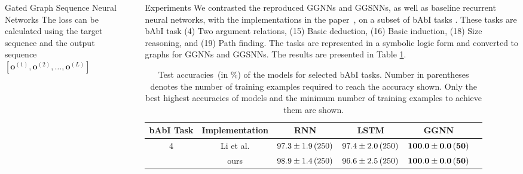 \documentclass[final,hyperref={pdfpagelabels=false}]{beamer}
\newcommand{\shrink}{-15pt}
\begin{document}
\begin{frame}[t]
\begin{columns}[t]
\begin{column}{.3\textwidth}
\begin{block}{Gated Graph Sequence Neural Networks}
    The loss can be calculated using the target sequence and the output sequence $[\boldsymbol{o}^{(1)}, \boldsymbol{o}^{(2)}, \ldots, \boldsymbol{o}^{(L)}]$
    
    \end{block}
    
    
    

  \end{column} %


  \begin{column}{.02\textwidth}\end{column} %
    
  \begin{column}{.3\textwidth} %
  
  \vspace{\shrink}
    \begin{block}{Experiments}
      We contrasted the reproduced GGNNs and GGSNNs, as well as baseline recurrent neural networks, with the implementations in the paper~\cite{DBLP:journals/corr/LiTBZ15}, on a subset of bAbI tasks \cite{DBLP:journals/corr/WestonBCM15}. These tasks are bAbI task (4) Two argument relations, (15) Basic deduction, (16) Basic induction, (18) Size reasoning, and (19) Path finding. The tasks are represented in a symbolic logic form and converted to graphs for GGNNs and GGSNNs. The results are presented in Table \ref{table:table-1}.\vspace{0.1in}
      
      \begin{table}[t]
          \caption{Test accuracies~(in \%) of the models for selected bAbI tasks. Number in parentheses denotes the number of training examples required to reach the accuracy shown. Only the best highest accuracies of models and the minimum number of training examples to achieve them are shown.}\label{table:table-1}
          \vspace{0.1in}
          \centering
          \small
          \begin{tabular}{cccccc}
              \toprule
              bAbI Task & Implementation & RNN & LSTM & GGNN \\  \midrule
              \multirow{2}{*}{4} & Li et al. & $97.3 \pm 1.9\thinspace (250)$ & $97.4 \pm 2.0\thinspace  (250)$ & $\mathbf{100.0 \pm 0.0\thinspace (50)}$ \\
              & ours & $98.9 \pm 1.4\thinspace (250)$ & $96.6 \pm 2.5\thinspace (250)$ & $\mathbf{100.0 \pm 0.0\thinspace (50)}$ \\  \midrule
        

\end{tabular}
\end{table}
\end{block}
\end{column}
\end{columns}
\end{frame}
\end{document}
